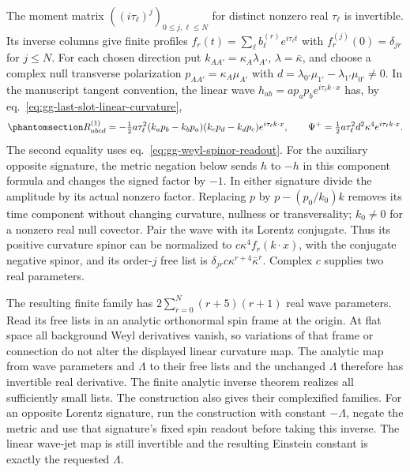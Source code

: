\documentclass[
  english,
  11pt,
  reqno]{amsart}
\begin{document}
The moment matrix \(((i\tau_\ell)^j)_{0\le j,\ell\le N}\) for distinct
nonzero real \(\tau_\ell\) is invertible. Its inverse columns give
finite profiles \(f_r(t)=\sum_\ell b_\ell^{(r)}e^{i\tau_\ell t}\) with
\(f_r^{(j)}(0)=\delta_{jr}\) for \(j\le N\). For each chosen direction
put \(k_{AA'}=\kappa_A\lambda_{A'}\), \(\lambda=\bar\kappa\), and choose
a complex null transverse polarization \(p_{AA'}=\kappa_A\mu_{A'}\) with
\(d=\lambda_{0'}\mu_{1'}-\lambda_{1'}\mu_{0'}\ne0\). In the manuscript
tangent convention, the linear wave
\(h_{ab}=a p_ap_be^{i\tau_\ell k\cdot x}\) has, by
eq.~\ref{eq:gg-last-slot-linear-curvature},
\begin{equation}\protect\phantomsection\label{eq:gg-finite-wave-component-readout}{
 R^{(1)}_{abcd}=-\tfrac12a\tau_\ell^2
 (k_ap_b-k_bp_a)(k_cp_d-k_dp_c)e^{i\tau_\ell k\cdot x},\qquad
 \Psi^+=\tfrac12a\tau_\ell^2d^2\kappa^4
                                      e^{i\tau_\ell k\cdot x} .
}\end{equation} The second equality uses
eq.~\ref{eq:gg-weyl-spinor-readout}. For the auxiliary opposite
signature, the metric negation below sends \(h\) to \(-h\) in this
component formula and changes the signed factor by \(-1\). In either
signature divide the amplitude by its actual nonzero factor. Replacing
\(p\) by \(p-(p_0/k_0)k\) removes its time component without changing
curvature, nullness or transversality; \(k_0\ne0\) for a nonzero real
null covector. Pair the wave with its Lorentz conjugate. Thus its
positive curvature spinor can be normalized to
\(c\kappa^4f_r(k\cdot x)\), with the conjugate negative spinor, and its
order-\(j\) free list is \(\delta_{jr}c\kappa^{r+4}\bar\kappa^r\).
Complex \(c\) supplies two real parameters.

The resulting finite family has \(2\sum_{r=0}^N(r+5)(r+1)\) real wave
parameters. Read its free lists in an analytic orthonormal spin frame at
the origin. At flat space all background Weyl derivatives vanish, so
variations of that frame or connection do not alter the displayed linear
curvature map. The analytic map from wave parameters and \(\Lambda\) to
their free lists and the unchanged \(\Lambda\) therefore has invertible
real derivative. The finite analytic inverse theorem realizes all
sufficiently small lists. The construction also gives their complexified
families. For an opposite Lorentz signature, run the construction with
constant \(-\Lambda\), negate the metric and use that signature's fixed
spin readout before taking this inverse. The linear wave-jet map is
still invertible and the resulting Einstein constant is exactly the
requested \(\Lambda\).
\end{document}
